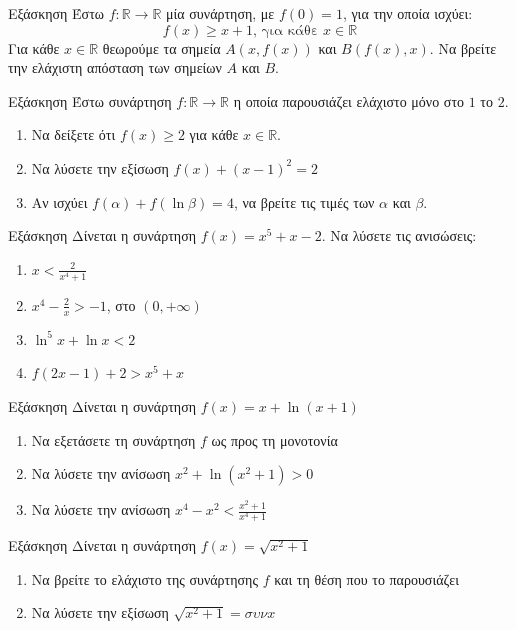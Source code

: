 \documentclass[greek]{beamer}
\begin{document}
\begin{frame}{Εξάσκηση}
      Έστω $f:\mathbb{R}\to\mathbb{R}$ μία συνάρτηση, με $f(0)=1$, για την οποία ισχύει:
      $$f(x)\ge x+1 \text{, για κάθε } x\in\mathbb{R}$$
      Για κάθε $x\in\mathbb{R}$ θεωρούμε τα σημεία $Α(x,f(x))$ και $Β(f(x),x)$. Να βρείτε την ελάχιστη απόσταση των σημείων $Α$ και $Β$.
\end{frame}

\begin{frame}{Εξάσκηση}
      Έστω συνάρτηση $f:\mathbb{R}\to \mathbb{R}$ η οποία παρουσιάζει ελάχιστο μόνο στο $1$ το $2$.
      \begin{enumerate}
            \item Να δείξετε ότι $f(x)\ge 2$ για κάθε $x\in\mathbb{R}$. \pause
            \item Να λύσετε την εξίσωση $f(x)+(x-1)^2=2$ \pause
            \item Αν ισχύει $f(α)+f(\ln β)=4$, να βρείτε τις τιμές των $α$ και $β$.
      \end{enumerate}
\end{frame}

\begin{frame}{Εξάσκηση}
      Δίνεται η συνάρτηση $f(x)=x^5+x-2$. Να λύσετε τις ανισώσεις:
      \begin{enumerate}
            \item $x<\frac{2}{x^4+1}$ \pause
            \item $x^4-\frac{2}{x}>-1$, στο $(0,+\infty)$ \pause
            \item $\ln^5 x+\ln x<2$ \pause
            \item $f(2x-1)+2>x^5+x$
      \end{enumerate}
\end{frame}

\begin{frame}{Εξάσκηση}
      Δίνεται η συνάρτηση $f(x)=x+\ln (x+1)$
      \begin{enumerate}
            \item Να εξετάσετε τη συνάρτηση $f$ ως προς τη μονοτονία \pause
            \item Να λύσετε την ανίσωση $x^2+\ln (x^2+1)>0$ \pause
            \item Να λύσετε την ανίσωση $x^4-x^2<\frac{x^2+1}{x^4+1}$
      \end{enumerate}
\end{frame}

\begin{frame}{Εξάσκηση}
      Δίνεται η συνάρτηση $f(x)=\sqrt{x^2+1}$
      \begin{enumerate}
            \item Να βρείτε το ελάχιστο της συνάρτησης $f$ και τη θέση που το παρουσιάζει \pause
            \item Να λύσετε την εξίσωση $\sqrt{x^2+1}=συν x$
      \end{enumerate}
\end{frame}
\end{document}
